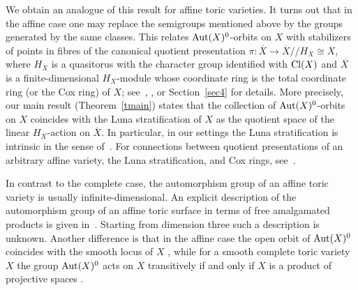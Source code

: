 \documentclass[12pt,a4paper]{amsart}
\theoremstyle{plain}
\theoremstyle{definition}
\begin{document}
We obtain an analogue of this result for affine toric
varieties. It turns out that in the affine case one may replace the semigroups mentioned above
by the groups generated by the same classes. This relates ${\mathop{\rm Aut}}(X)^0$-orbits on $X$ with
stabilizers of points in fibres of the canonical quotient presentation
$\pi: \overline{X} \to \overline{X}/\!/H_X \cong X$, where $H_X$ is a quasitorus
with the character group identified with ${\mathop{\rm Cl}}(X)$ and $\overline{X}$ is a
finite-dimensional $H_X$-module whose coordinate ring is the total coordinate ring
(or the Cox ring) of $X$; see~\cite{Cox}, \cite[Chapter~5]{CLS}, or Section~\ref{sec4}
for details. More precisely, our main result (Theorem~\ref{tmain}) states that
the collection of ${\mathop{\rm Aut}}(X)^0$-orbits on $X$ coincides with the Luna stratification of $X$
as the quotient space of the linear $H_X$-action on $\overline{X}$.
In particular, in our settings the Luna stratification is intrinsic in the sense of~\cite{KR}.
For connections between quotient presentations of an arbitrary affine variety,
the Luna stratification, and Cox rings, see~\cite{Ar}.

In contrast to the complete case, the automorphism group of an affine toric variety
is usually infinite-dimensional. An explicit description of the automorphism group of an affine toric surface in terms of free amalgamated products is given in~\cite{AZ}.
Starting from dimension three such a description is unknown. Another difference is that
in the affine case the open orbit of ${\mathop{\rm Aut}}(X)^0$ coincides with the smooth locus of $X$
\cite[Theorem~2.1]{AKZ}, while for a smooth complete toric variety $X$ the group ${\mathop{\rm Aut}}(X)^0$
acts on $X$ transitively if and only if $X$ is a product of projective spaces
\cite[Theorem~2.8]{Ba}.
\end{document}
